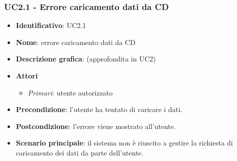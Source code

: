 \subsubsection{UC2.1 - Errore caricamento dati da CD}
\begin{itemize}
  \item \textbf{Identificativo}: UC2.1
  \item \textbf{Nome}: errore caricamento dati da CD
  \item \textbf{Descrizione grafica}: (approfondita in UC2)
  \item \textbf{Attori}
        \begin{itemize}
          \item \textit{Primari}: utente autorizzato
        \end{itemize}
  \item \textbf{Precondizione}: l'utente ha tentato di caricare i dati.
  \item \textbf{Postcondizione}: l'errore viene mostrato all'utente.
  \item \textbf{Scenario principale}: il sistema non è riuscito a gestire la richiesta di caricamento dei dati da parte dell'utente.
\end{itemize}